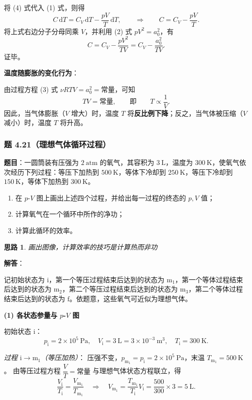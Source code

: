 \documentclass[UTF8]{ctexart}
\newtheorem{thoughts}{思路}[subsection]
\begin{document}
将 (4) 式代入 (1) 式，则得
\[
C\,\mathrm{d}T=C_V\,\mathrm{d}T-\frac{pV}{T}\,\mathrm{d}T,
\qquad\Longrightarrow\qquad
C=C_V-\frac{pV}{T}.
\]
将上式右边分子分母同乘 $V$，并利用 (2) 式 $pV^2=a_0^2$，有
\[
C=C_V-\frac{pV^2}{TV}=C_V-\frac{a_0^2}{TV}.
\]
证毕。

\textbf{温度随膨胀的变化行为}：

由过程方程 (3) 式 $\nu RTV=a_0^2=\text{常量}$，可知
\[
TV=\text{常量},\qquad\text{即}\qquad T\propto\frac{1}{V}.
\]
因此，当气体膨胀（$V$ 增大）时，温度 $T$ 将\textbf{反比例下降}；反之，当气体被压缩（$V$ 减小）时，温度 $T$ 将升高。


\subsubsection{题 4.21（理想气体循环过程）}

\textbf{题目}：一圆筒装有压强为 $2\ \mathrm{atm}$ 的氧气，其容积为 $3\ \mathrm{L}$，温度为 $300\ \mathrm{K}$，使氧气依次经历下列过程：等压下加热到 $500\ \mathrm{K}$，等体下冷却到 $250\ \mathrm{K}$，等压下冷却到 $150\ \mathrm{K}$，等体下加热到 $300\ \mathrm{K}$。
\begin{enumerate}
    \item[(1)] 在 $p$-$V$ 图上画出上述四个过程，并给出每一过程的终态的 $p,V$ 值；
    \item[(2)] 计算氧气在一个循环中所作的净功；
    \item[(3)] 计算此循环的效率。
\end{enumerate}

\begin{thoughts}
  画出图像，计算效率的技巧是计算热而非功
\end{thoughts}

\textbf{解答}：

记初始状态为 $\mathrm{i}$，第一个等压过程结束后达到的状态为 $\mathrm{m}_1$，第一个等体过程结束后达到的状态为 $\mathrm{m}_2$，第二个等压过程结束后达到的状态为 $\mathrm{m}_3$，第二个等体过程结束后达到的状态为 $\mathrm{f}$。依题意，这些氧气可近似为理想气体。

\textbf{(1) 各状态参量与 $p$-$V$ 图}

初始状态 $\mathrm{i}$：
\[
p_{\mathrm{i}}=2\times 10^{5}\ \mathrm{Pa},\quad
V_{\mathrm{i}}=3\ \mathrm{L}=3\times 10^{-3}\ \mathrm{m^{3}},\quad
T_{\mathrm{i}}=300\ \mathrm{K}.
\]

\textit{过程 $\mathrm{i}\to\mathrm{m}_1$（等压加热）}：
压强不变，$p_{\mathrm{m}_1}=p_{\mathrm{i}}=2\times 10^{5}\ \mathrm{Pa}$，末温 $T_{\mathrm{m}_1}=500\ \mathrm{K}$。
由等压过程方程 $\dfrac{V}{T}=\text{常量}$ 与理想气体状态方程联立，得
\[
\frac{V_{\mathrm{i}}}{T_{\mathrm{i}}}=\frac{V_{\mathrm{m}_1}}{T_{\mathrm{m}_1}}
\quad\Longrightarrow\quad
V_{\mathrm{m}_1}=\frac{T_{\mathrm{m}_1}}{T_{\mathrm{i}}}V_{\mathrm{i}}
=\frac{500}{300}\times 3=5\ \mathrm{L}.
\]
\end{document}
